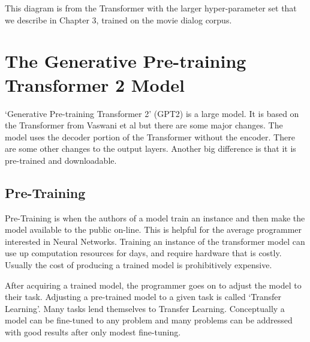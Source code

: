 This diagram is from the Transformer with the larger hyper-parameter set that we describe in Chapter 3, trained on the movie dialog corpus.


\section{The Generative Pre-training Transformer 2 Model}

`Generative Pre-training Transformer 2' (\ac{GPT2}) is a large model. It is based on the Transformer from Vaswani et al \cite{Vaswani2017AttentionIA} but there are some major changes. The model uses the decoder portion of the Transformer without the encoder. There are some other changes to the output layers. Another big difference is that it is pre-trained and downloadable.

\subsection{Pre-Training}
Pre-Training is when the authors of a model train an instance and then make the model available to the public on-line. This is helpful for the average programmer interested in Neural Networks. Training an instance of the transformer model can use up computation resources for days, and require hardware that is costly. Usually the cost of producing a trained model is prohibitively expensive.

After acquiring a trained model, the programmer goes on to adjust the model to their task. Adjusting a pre-trained model to a given task is called `Transfer Learning'. Many tasks lend themselves to Transfer Learning. Conceptually a model can be fine-tuned to any problem and many problems can be addressed with good results after only modest fine-tuning.

